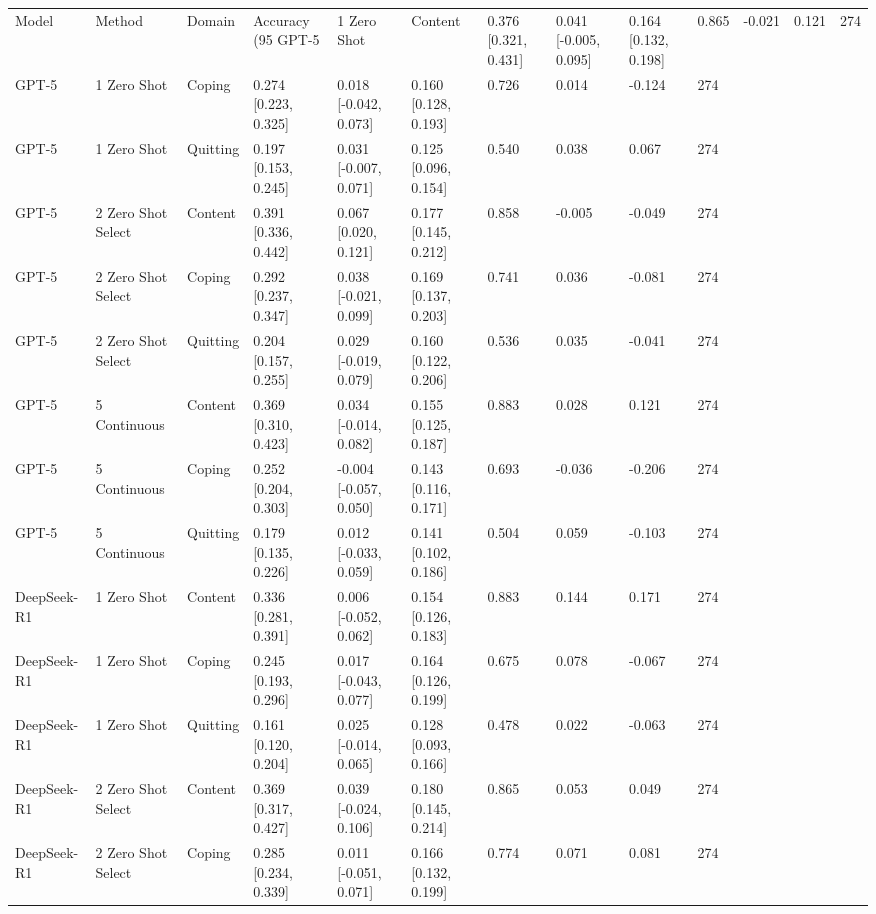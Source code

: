 \begin{tabular}{llllllllll}
\toprule
Model & Method & Domain & Accuracy (95%
\midrule
GPT-5 & 1 Zero Shot & Content & 0.376 [0.321, 0.431] & 0.041 [-0.005, 0.095] & 0.164 [0.132, 0.198] & 0.865 & -0.021 & 0.121 & 274 \\
GPT-5 & 1 Zero Shot & Coping & 0.274 [0.223, 0.325] & 0.018 [-0.042, 0.073] & 0.160 [0.128, 0.193] & 0.726 & 0.014 & -0.124 & 274 \\
GPT-5 & 1 Zero Shot & Quitting & 0.197 [0.153, 0.245] & 0.031 [-0.007, 0.071] & 0.125 [0.096, 0.154] & 0.540 & 0.038 & 0.067 & 274 \\
GPT-5 & 2 Zero Shot Select & Content & 0.391 [0.336, 0.442] & 0.067 [0.020, 0.121] & 0.177 [0.145, 0.212] & 0.858 & -0.005 & -0.049 & 274 \\
GPT-5 & 2 Zero Shot Select & Coping & 0.292 [0.237, 0.347] & 0.038 [-0.021, 0.099] & 0.169 [0.137, 0.203] & 0.741 & 0.036 & -0.081 & 274 \\
GPT-5 & 2 Zero Shot Select & Quitting & 0.204 [0.157, 0.255] & 0.029 [-0.019, 0.079] & 0.160 [0.122, 0.206] & 0.536 & 0.035 & -0.041 & 274 \\
GPT-5 & 5 Continuous & Content & 0.369 [0.310, 0.423] & 0.034 [-0.014, 0.082] & 0.155 [0.125, 0.187] & 0.883 & 0.028 & 0.121 & 274 \\
GPT-5 & 5 Continuous & Coping & 0.252 [0.204, 0.303] & -0.004 [-0.057, 0.050] & 0.143 [0.116, 0.171] & 0.693 & -0.036 & -0.206 & 274 \\
GPT-5 & 5 Continuous & Quitting & 0.179 [0.135, 0.226] & 0.012 [-0.033, 0.059] & 0.141 [0.102, 0.186] & 0.504 & 0.059 & -0.103 & 274 \\
DeepSeek-R1 & 1 Zero Shot & Content & 0.336 [0.281, 0.391] & 0.006 [-0.052, 0.062] & 0.154 [0.126, 0.183] & 0.883 & 0.144 & 0.171 & 274 \\
DeepSeek-R1 & 1 Zero Shot & Coping & 0.245 [0.193, 0.296] & 0.017 [-0.043, 0.077] & 0.164 [0.126, 0.199] & 0.675 & 0.078 & -0.067 & 274 \\
DeepSeek-R1 & 1 Zero Shot & Quitting & 0.161 [0.120, 0.204] & 0.025 [-0.014, 0.065] & 0.128 [0.093, 0.166] & 0.478 & 0.022 & -0.063 & 274 \\
DeepSeek-R1 & 2 Zero Shot Select & Content & 0.369 [0.317, 0.427] & 0.039 [-0.024, 0.106] & 0.180 [0.145, 0.214] & 0.865 & 0.053 & 0.049 & 274 \\
DeepSeek-R1 & 2 Zero Shot Select & Coping & 0.285 [0.234, 0.339] & 0.011 [-0.051, 0.071] & 0.166 [0.132, 0.199] & 0.774 & 0.071 & 0.081 & 274 \\

\end{tabular}
